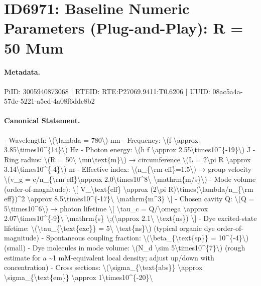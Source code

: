 \section*{ID6971: Baseline Numeric Parameters (Plug-and-Play): R = 50 Mum}
\paragraph{Metadata.}
PiID: 3005940873068 | RTEID: RTE:P27069.9411:T0.6206 | UUID: 08ac5a4a-57de-5221-a5ed-4a08f6ddc8b2

\paragraph{Canonical Statement.}
- Wavelength: \textbackslash{}(\textbackslash{}lambda = 780\textbackslash{}) nm - Frequency: \textbackslash{}(f \textbackslash{}approx 3.85\textbackslash{}times10\textasciicircum{}\{14\}\textbackslash{}) Hz - Photon energy: \textbackslash{}(h f \textbackslash{}approx 2.55\textbackslash{}times10\textasciicircum{}\{-19\}\textbackslash{}) J - Ring radius: \textbackslash{}(R = 50\textbackslash{} \textbackslash{}mu\textbackslash{}text\{m\}\textbackslash{}) → circumference \textbackslash{}(L = 2\textbackslash{}pi R \textbackslash{}approx 3.14\textbackslash{}times10\textasciicircum{}\{-4\}\textbackslash{}) m - Effective index: \textbackslash{}(n\_\{\textbackslash{}rm eff\}=1.5\textbackslash{}) → group velocity \textbackslash{}(v\_g = c/n\_\{\textbackslash{}rm eff\}\textbackslash{}approx 2.0\textbackslash{}times10\textasciicircum{}8\textbackslash{} \textbackslash{}mathrm\{m/s\}\textbackslash{}) - Mode volume (order-of-magnitude): \textbackslash{}[ V\_\textbackslash{}text\{eff\} \textbackslash{}approx (2\textbackslash{}pi R)\textbackslash{}times(\textbackslash{}lambda/n\_\{\textbackslash{}rm eff\})\textasciicircum{}2 \textbackslash{}approx 8.5\textbackslash{}times10\textasciicircum{}\{-17\}\textbackslash{} \textbackslash{}mathrm\{m\textasciicircum{}3\} \textbackslash{}] - Chosen cavity Q: \textbackslash{}(Q = 5\textbackslash{}times10\textasciicircum{}6\textbackslash{}) → photon lifetime \textbackslash{}[ \textbackslash{}tau\_c = Q/\textbackslash{}omega \textbackslash{}approx 2.07\textbackslash{}times10\textasciicircum{}\{-9\}\textbackslash{} \textbackslash{}mathrm\{s\} \textbackslash{};(\textbackslash{}approx 2.1\textbackslash{} \textbackslash{}text\{ns\}) \textbackslash{}] - Dye excited-state lifetime: \textbackslash{}(\textbackslash{}tau\_\{\textbackslash{}text\{exc\}\} = 5\textbackslash{} \textbackslash{}text\{ns\}\textbackslash{}) (typical organic dye order-of-magnitude) - Spontaneous coupling fraction: \textbackslash{}(\textbackslash{}beta\_\{\textbackslash{}text\{sp\}\} = 10\textasciicircum{}\{-4\}\textbackslash{}) (small) - Dye molecules in mode volume: \textbackslash{}(N\_d \textbackslash{}sim 5\textbackslash{}times10\textasciicircum{}\{7\}\textbackslash{}) (rough estimate for a \textasciitilde{}1 mM-equivalent local density; adjust up/down with concentration) - Cross sections: \textbackslash{}(\textbackslash{}sigma\_\{\textbackslash{}text\{abs\}\} \textbackslash{}approx \textbackslash{}sigma\_\{\textbackslash{}text\{em\}\} \textbackslash{}approx 1\textbackslash{}times10\textasciicircum{}\{-20\}\textbackslash{} 